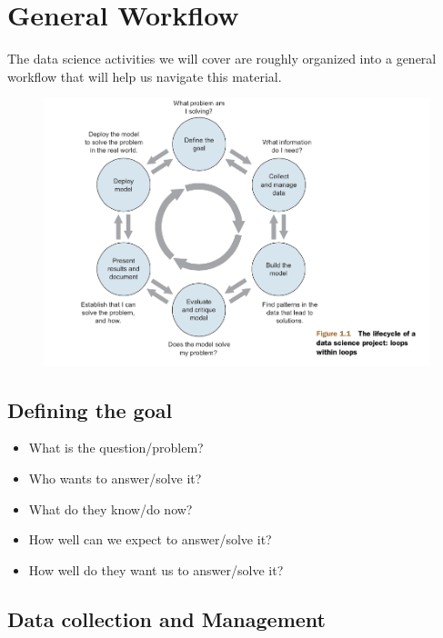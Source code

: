 \documentclass[]{book}
\providecommand{\tightlist}{%
  \setlength{\itemsep}{0pt}\setlength{\parskip}{0pt}}
\theoremstyle{definition}
\theoremstyle{definition}
\theoremstyle{remark}
\begin{document}
\section{General Workflow}\label{general-workflow}

The data science activities we will cover are roughly organized into a
general workflow that will help us navigate this material.

\begin{figure}
\centering
\includegraphics{img/zumel_mount_cycle.png}
\caption{}
\end{figure}

\subsection{Defining the goal}\label{defining-the-goal}

\begin{itemize}
\tightlist
\item
  What is the question/problem?
\item
  Who wants to answer/solve it?
\item
  What do they know/do now?
\item
  How well can we expect to answer/solve it?
\item
  How well do they want us to answer/solve it?
\end{itemize}

\subsection{Data collection and
Management}\label{data-collection-and-management}
\end{document}

